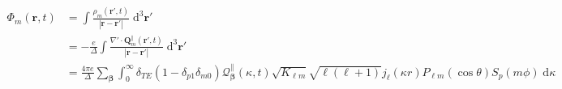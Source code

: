 \documentclass{article}
\begin{document}
\begin{equation}
\begin{split}
\Phi_m(\mathbf{r},t) &= \int\frac{\rho_m(\mathbf{r}',t)}{|\mathbf{r} - \mathbf{r}'|}\;\mathrm{d}^3\mathbf{r}'\\
&= -\frac{e}{\Delta}\int\frac{\nabla'\cdot\mathbf{Q}_m^\parallel(\mathbf{r}',t)}{|\mathbf{r} - \mathbf{r}'|}\;\mathrm{d}^3\mathbf{r}'\\
&= \frac{4\pi e}{\Delta}\sum_{\bm{\beta}}\int_0^\infty\delta_{TE}(1 - \delta_{p1}\delta_{m0})\mathcal{Q}_{\bm{\beta}}^\parallel(\kappa,t)\sqrt{K_{\ell m}}\sqrt{\ell(\ell + 1)}j_\ell(\kappa r)P_{\ell m}(\cos\theta)S_p(m\phi)\;\mathrm{d}\kappa
\end{split}
\end{equation}
\end{document}
